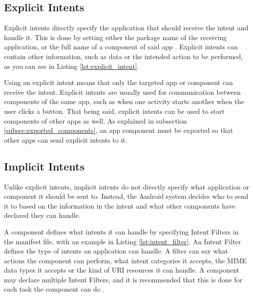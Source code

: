     \subsection{Explicit Intents}
        \label{sec:explicit_intents}
        
    Explicit intents directly specify the application that should receive the intent and handle it. This is done by setting either the package name of the receiving application, or the full name of a component of said app \cite{intents_and_intent_filters}. Explicit intents can contain other information, such as data or the intended action to be performed, as you can see in Listing \ref{lst:explicit_intent}.
    
    Using an explicit intent means that only the targeted app or component can receive the intent. Explicit intents are usually used for communication between components of the same app, such as when one activity starts another when the user clicks a button. That being said, explicit intents can be used to start components of other apps as well. As explained in subsection \ref{subsec:exported_components}, an app component must be exported so that other apps can send explicit intents to it.
    
    
    
    \subsection{Implicit Intents}
        \label{sec:implicit_intents}
        
    Unlike explicit intents, implicit intents do not directly specify what application or component it should be sent to. Instead, the Android system decides who to send it to based on the information in the intent and what other components have declared they can handle.
    
    A component defines what intents it can handle by specifying Intent Filters in the manifest file, with an example in Listing \ref{lst:intent_filter}. An Intent Filter defines the type of intents an application can handle. A filter can say what actions the component can perform, what intent categories it accepts, the MIME data types it accepts or the kind of URI resources it can handle. A component may declare multiple Intent Filters, and it is recommended that this is done for each task the component can do \cite{intents_and_intent_filters}.
    
